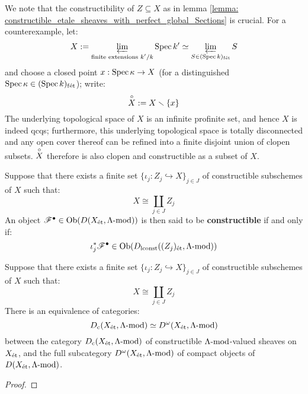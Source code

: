             \begin{example}
                We note that the constructibility of $Z \subseteq X$ as in lemma \ref{lemma: constructible_etale_sheaves_with_perfect_global_Sections} is crucial. For a counterexample, let:
                    $$X := \projlim_{\text{finite extensions $k'/k$}} \Spec k' \cong \projlim_{S \in (\Spec k)_{\fet}} S$$
                and choose a closed point $x: \Spec \kappa \to X$ (for a distinguished $\Spec \kappa \in (\Spec k)_{\fet}$); write:
                    $$\punc{X} := X \setminus \{x\}$$
                The underlying topological space of $X$ is an infinite profinite set, and hence $X$ is indeed qcqs; furthermore, this underlying topological space is totally disconnected and any open cover thereof can be refined into a finite disjoint union of clopen subsets. $\punc{X}$ therefore is also clopen and constructible as a subset of $X$.
            \end{example}
            \begin{definition} \label{def: constructible_etale_sheaves}
                Suppose that there exists a finite set $\{\iota_j: Z_j \hookrightarrow X\}_{j \in J}$ of constructible subschemes of $X$ such that:
                    $$X \cong \coprod_{j \in J} Z_j$$
                An object $\scrF^{\bullet} \in \Ob( D(X_{\et}, \Lambda\mod) )$ is then said to be \textbf{constructible} if and only if:
                    $$\iota_j^*\scrF^{\bullet} \in \Ob( D_{\locallyconstant}((Z_j)_{\et}, \Lambda\mod) )$$
            \end{definition}
            \begin{proposition} \label{prop: constructible_etale_sheaves_are_compact}
                Suppose that there exists a finite set $\{\iota_j: Z_j \hookrightarrow X\}_{j \in J}$ of constructible subschemes of $X$ such that:
                    $$X \cong \coprod_{j \in J} Z_j$$
                There is an equivalence of categories:
                    $$D_{\cons}(X_{\et}, \Lambda\mod) \cong D^{\omega}(X_{\et}, \Lambda\mod)$$
                between the category $D_{\cons}(X_{\et}, \Lambda\mod)$ of constructible $\Lambda\mod$-valued sheaves on $X_{\et}$, and the full subcategory $D^{\omega}(X_{\et}, \Lambda\mod)$ of compact objects of $D(X_{\et}, \Lambda\mod)$.
            \end{proposition}
                \begin{proof}
                    
                \end{proof}

